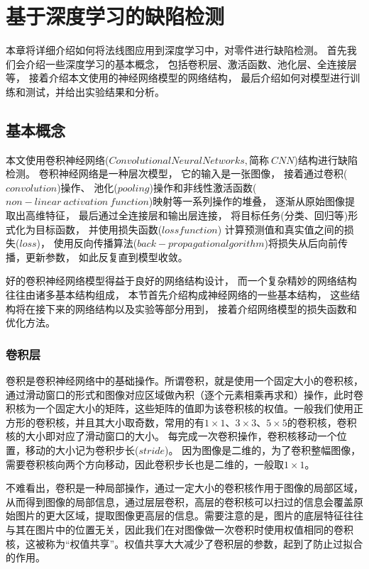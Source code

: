 \chapter{基于深度学习的缺陷检测}


本章将详细介绍如何将法线图应用到深度学习中，对零件进行缺陷检测。
首先我们会介绍一些深度学习的基本概念，
包括卷积层、激活函数、池化层、全连接层等，
接着介绍本文使用的神经网络模型的网络结构，
最后介绍如何对模型进行训练和测试，并给出实验结果和分析。

\section{基本概念}

本文使用卷积神经网络($Convolutional Neural Networks,\mbox{简称}~CNN$)结构进行缺陷检测。
卷积神经网络是一种层次模型，
它的输入是一张图像，
接着通过卷积($convolution$)操作、
池化\cite{chechik1998synaptic}($pooling$)操作和非线性激活函数($non-linear~activation~function$)映射等一系列操作的堆叠，
逐渐从原始图像提取出高维特征，
最后通过全连接层和输出层连接，
将目标任务(分类、回归等)形式化为目标函数，
并使用损失函数($loss function$)
计算预测值和真实值之间的损失($loss$)，
使用反向传播算法\cite{周志华2016机器学习}($back-propagation algorithm$)将损失从后向前传播，更新参数，
如此反复直到模型收敛。

好的卷积神经网络模型得益于良好的网络结构设计，
而一个复杂精妙的网络结构往往由诸多基本结构组成，
本节首先介绍构成神经网络的一些基本结构，
这些结构将在接下来的网络结构以及实验等部分用到，
接着介绍网络模型的损失函数和优化方法。

\subsection{卷积层}

卷积是卷积神经网络中的基础操作。所谓卷积，就是使用一个固定大小的卷积核，通过滑动窗口的形式和图像对应区域做內积（逐个元素相乘再求和）操作，此时卷积核为一个固定大小的矩阵，这些矩阵的值即为该卷积核的权值。一般我们使用正方形的卷积核，并且其大小取奇数，常用的有$1\times 1$、$3\times 3$、$5\times 5$的卷积核，卷积核的大小即对应了滑动窗口的大小。
每完成一次卷积操作，卷积核移动一个位置，移动的大小记为卷积步长($stride$)。
因为图像是二维的，为了卷积整幅图像，需要卷积核向两个方向移动，因此卷积步长也是二维的，一般取$1\times 1$。

不难看出，卷积是一种局部操作，通过一定大小的卷积核作用于图像的局部区域，从而得到图像的局部信息，通过层层卷积，高层的卷积核可以扫过的信息会覆盖原始图片的更大区域，提取图像更高层的信息。需要注意的是，图片的底层特征往往与其在图片中的位置无关，因此我们在对图像做一次卷积时使用权值相同的卷积核，这被称为“权值共享”。权值共享大大减少了卷积层的参数，起到了防止过拟合的作用。

